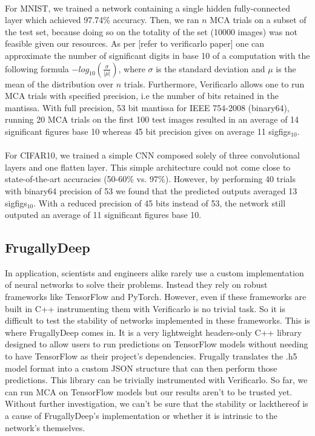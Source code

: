 \documentclass[a4paper,12pt]{article}
\begin{document}
\paragraph{}
For MNIST, we trained a network containing a single hidden fully-connected layer
which achieved 97.74\% accuracy. Then, we ran $n$ MCA trials on a subset of the
test set, because doing so on the totality of the set (10000 images) was not
feasible given our resources. As per [refer to verificarlo paper] one can
approximate the number of significant digits in base 10 of a computation with
the following formula $-{log_{10}(\frac{\sigma}{|\mu|})}$, where $\sigma$ is the
standard deviation and $\mu$ is the mean of the distribution over $n$ trials.
Furthermore, Verificarlo allows one to run MCA trials with specified precision,
i.e the number of bits retained in the mantissa. With full precision, 53 bit
mantissa for IEEE 754-2008 (binary64), running 20 MCA trials on the first 100
test images resulted in an average of 14 significant figures base 10 whereas 45
bit precision gives on average 11 sigfigs$_{10}$.
\paragraph{}
For CIFAR10, we trained a simple CNN composed solely of three convolutional
layers and one flatten layer. This simple architecture could not come close to
state-of-the-art accuracies (50-60\% vs. 97\%). However, by performing 40 trials
with binary64 precision of 53 we found that the predicted outputs averaged 13
sigfigs$_{10}$. With a reduced precision of 45 bits instead of 53, the network
still outputed an average of 11 significant figures base 10.

\subsection{FrugallyDeep}
In application, scientists and engineers alike rarely use a custom
implementation of neural networks to solve their problems. Instead they rely on
robust frameworks like TensorFlow and PyTorch. However, even if these frameworks
are built in C++ instrumenting them with Verificarlo is no trivial task. So it
is difficult to test the stability of networks implemented in these frameworks.
This is where FrugallyDeep comes in. It is a very lightweight headers-only C++
library designed to allow users to run predictions on TensorFlow models without
needing to have TensorFlow as their project's dependencies. Frugally translates
the .h5 model format into a custom JSON structure that can then perform those
predictions. This library can be trivially instrumented with Verificarlo. So
far, we can run MCA on TensorFlow models but our results aren't to be trusted
yet. Without further investigation, we can't be sure that the stability or
lackthereof is a cause of FrugallyDeep's implementation or whether it is
intrinsic to the network's themselves.
\end{document}
